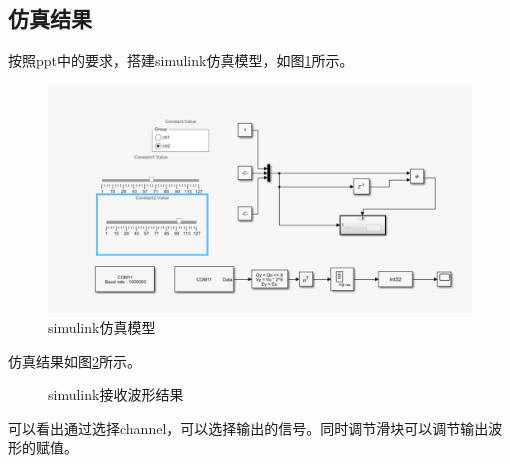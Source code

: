\documentclass[UTF8]{ctexart}
\begin{document}
\subsection{仿真结果}
按照ppt中的要求，搭建simulink仿真模型，如图\ref{fig:simulink}所示。
\begin{figure}[!ht]
    \centering
    \includegraphics[width=\textwidth]{simulink.png}
    \caption{simulink仿真模型}
    \label{fig:simulink}
\end{figure}

仿真结果如图\ref{fig:simulink_result}所示。


\begin{figure}[!ht]
    \centering
    \caption{simulink接收波形结果}
    \label{fig:simulink_result}
\end{figure}

可以看出通过选择channel，可以选择输出的信号。同时调节滑块可以调节输出波形的赋值。
\end{document}
